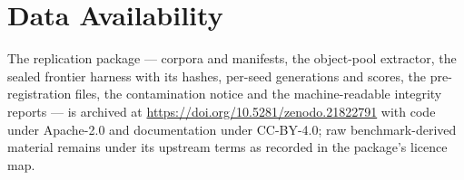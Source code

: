 \documentclass[conference]{IEEEtran}
\begin{document}
\section*{Data Availability}
The replication package --- corpora and manifests, the object-pool extractor, the
sealed frontier harness with its hashes, per-seed generations and scores, the
pre-registration files, the contamination notice and the machine-readable
integrity reports --- is archived at
\mbox{\url{https://doi.org/10.5281/zenodo.21822791}} with code under Apache-2.0 and documentation under CC-BY-4.0; raw
benchmark-derived material remains under its upstream terms as recorded in the
package's licence map.



\end{document}
